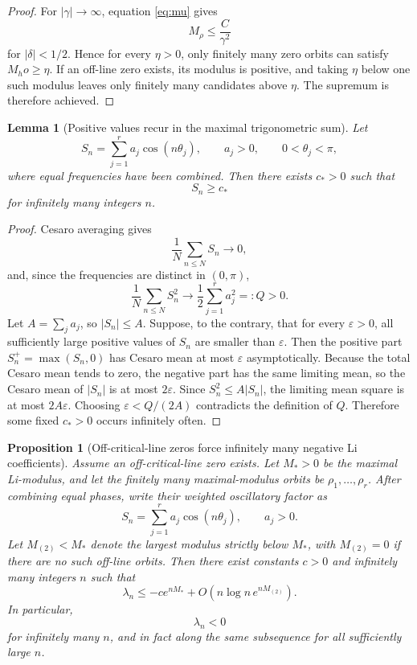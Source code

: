 \documentclass[11pt]{article}
\newtheorem{proposition}[theorem]{Proposition}
\newtheorem{lemma}[theorem]{Lemma}
\newcommand{\Li}{\lambda}
\newcommand{\eps}{\varepsilon}
\begin{document}
\begin{proof}
For \(|\gamma|\to\infty\), equation \eqref{eq:mu} gives
\[
M_\rho
\le \frac{C}{\gamma^2}
\]
for $|\delta|<1/2$. Hence for every $\eta>0$, only finitely many zero orbits can satisfy $M_
ho\ge\eta$. If an off-line zero exists, its modulus is positive, and taking $\eta$ below one such modulus leaves only finitely many candidates above $\eta$. The supremum is therefore achieved.
\end{proof}

\begin{lemma}[Positive values recur in the maximal trigonometric sum]
Let
\[
S_n=\sum_{j=1}^r a_j\cos(n\theta_j),
\qquad a_j>0,
\qquad 0<\theta_j<\pi,
\]
where equal frequencies have been combined. Then there exists \(c_*>0\) such that
\[
S_n\ge c_*
\]
for infinitely many integers \(n\).
\end{lemma}

\begin{proof}
Cesaro averaging gives
\[
\frac1N\sum_{n\le N}S_n\to0,
\]
and, since the frequencies are distinct in \((0,\pi)\),
\[
\frac1N\sum_{n\le N}S_n^2
\to
\frac12\sum_{j=1}^r a_j^2
=:Q>0.
\]
Let \(A=\sum_j a_j\), so \(|S_n|\le A\). Suppose, to the contrary, that for every \(\eps>0\), all sufficiently large positive values of \(S_n\) are smaller than \(\eps\). Then the positive part \(S_n^+=\max(S_n,0)\) has Cesaro mean at most \(\eps\) asymptotically. Because the total Cesaro mean tends to zero, the negative part has the same limiting mean, so the Cesaro mean of \(|S_n|\) is at most \(2\eps\). Since \(S_n^2\le A|S_n|\), the limiting mean square is at most \(2A\eps\). Choosing \(\eps<Q/(2A)\) contradicts the definition of \(Q\). Therefore some fixed \(c_*>0\) occurs infinitely often.
\end{proof}

\begin{proposition}[Off-critical-line zeros force infinitely many negative Li coefficients]
Assume an off-critical-line zero exists. Let \(M_*>0\) be the maximal Li-modulus, and let the finitely many maximal-modulus orbits be \(\rho_1,\ldots,\rho_r\). After combining equal phases, write their weighted oscillatory factor as
\[
S_n=\sum_{j=1}^r a_j\cos(n\theta_j),
\qquad a_j>0.
\]
Let \(M_{(2)}<M_*\) denote the largest modulus strictly below \(M_*\), with \(M_{(2)}=0\) if there are no such off-line orbits. Then there exist constants \(c>0\) and infinitely many integers \(n\) such that
\begin{equation}
\Li_n
\le
-c e^{nM_*}
+O\left(n\log n\,e^{nM_{(2)}}\right).
\label{eq:negativeasymptotic}
\end{equation}
In particular,
\begin{equation}
\Li_n<0
\end{equation}
for infinitely many \(n\), and in fact along the same subsequence for all sufficiently large \(n\).
\end{proposition}
\end{document}
